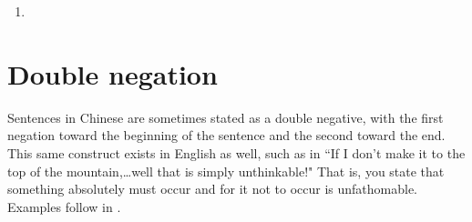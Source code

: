 \begin{example}
\begin{enumerate}
  \item %
    \zhtsC%
    \zhtsP{}
\end{enumerate}
\end{example}

\section{Double negation}
\quad\begin{minipage}{\tw-68mm}%
  Sentences in Chinese are sometimes stated as a double negative,
  with the first negation toward the beginning of the sentence and the
  second toward the end.
  This same construct exists in English as well, such as in
  ``If I don't make it to the top of the mountain,\ldots well that is simply unthinkable!"
  That is, you state that something absolutely must occur and
  for it not to occur is unfathomable.
  Examples follow in .
\end{minipage}

